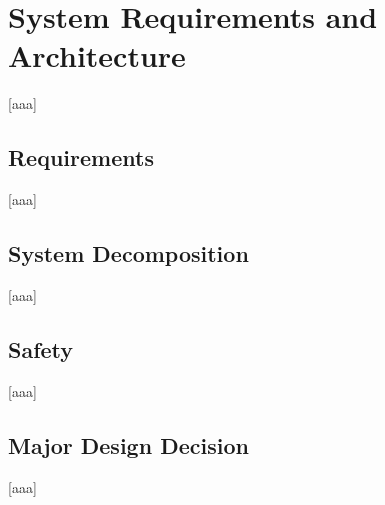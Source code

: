 \chapter{System Requirements and Architecture} \label{sec:System Requirements and Architecture}
    [aaa]

\section{Requirements} \label{sec:Requirements}
    [aaa]

\section{System Decomposition} \label{sec:System Decomposition}
    [aaa]

\section{Safety} \label{sec:Safety}
    [aaa]

\section{Major Design Decision} \label{sec:Major Design Decision}
    [aaa]